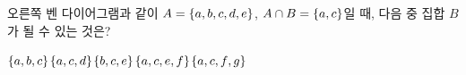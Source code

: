 \noindent\begin{minipage}[t]{0.58\linewidth}\vspace{0pt}\raggedright 오른쪽 벤 다이어그램과 같이 $A=\{a{,}\mkern3mu\mathopen{}b{,}\mkern3mu\mathopen{}c{,}\mkern3mu\mathopen{}d{,}\mkern3mu\mathopen{}e\}$, $A\cap B=\{a{,}\mkern3mu\mathopen{}c\}$일 때, 다음 중 집합 $B$가 될 수 있는 것은?\end{minipage}\hfill\begin{minipage}[t]{0.4\linewidth}\vspace{0pt}\centering \resizebox{\ifdim\width>\linewidth\linewidth\else\width\fi}{!}{}\end{minipage}\par
\begin{choices32}{$\{a{,}\mkern3mu\mathopen{}b{,}\mkern3mu\mathopen{}c\}$}{$\{a{,}\mkern3mu\mathopen{}c{,}\mkern3mu\mathopen{}d\}$}{$\{b{,}\mkern3mu\mathopen{}c{,}\mkern3mu\mathopen{}e\}$}{$\{a{,}\mkern3mu\mathopen{}c{,}\mkern3mu\mathopen{}e{,}\mkern3mu\mathopen{}f\}$}{$\{a{,}\mkern3mu\mathopen{}c{,}\mkern3mu\mathopen{}f{,}\mkern3mu\mathopen{}g\}$}\end{choices32}
